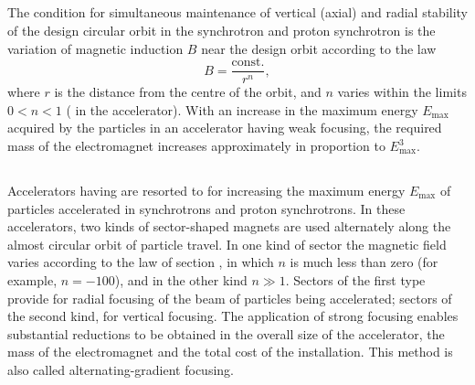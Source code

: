 \subsection{}\label{24.4.11} The condition for simultaneous maintenance of vertical (axial) and radial stability of the design circular orbit in the synchrotron and proton synchrotron is the variation of magnetic induction $B$ near the design orbit according to the law
\begin{equation*}%
B = \frac{\text{const.}}{r^{n}},
\end{equation*}
where $r$ is the distance from the centre of the orbit, and $n$ varies within the limits $0 < n < 1$ ( in the accelerator). With an increase in the maximum energy $E_{\text{max}}$ acquired by the particles in an accelerator having weak focusing, the required mass of the electromagnet increases approximately in proportion to $E_{\text{max}}^{3}$.

\subsection{}\label{24.4.12} Accelerators having  are resorted to for increasing the maximum energy $E_{\text{max}}$ of particles accelerated in synchrotrons and proton synchrotrons. In these accelerators, two kinds of sector-shaped magnets are used alternately along the almost circular orbit of particle travel. In one kind of sector the magnetic field varies according to the law of section , in which $n$ is much less than zero (for example, $n = - 100$), and in the other kind $n \gg 1$. Sectors of the first type provide for radial focusing of the beam of particles being accelerated; sectors of the second kind, for vertical focusing. The application of strong focusing enables substantial reductions to be obtained in the overall size of the accelerator, the mass of the electromagnet and the total cost of the installation. This method is also called alternating-gradient focusing.

